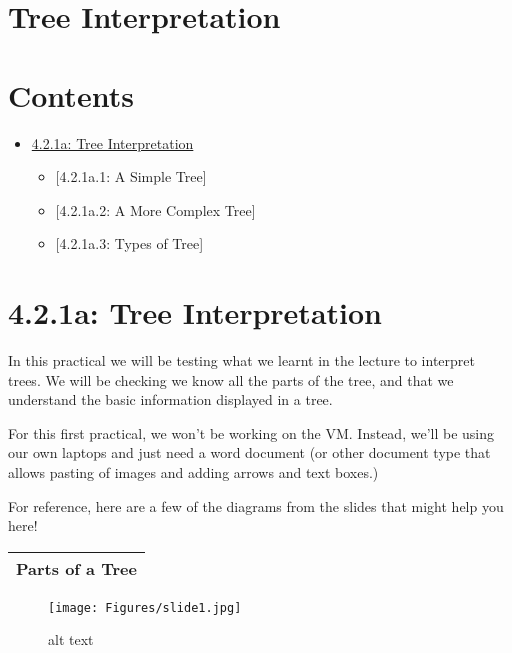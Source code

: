 \documentclass[
]{article}
\author{}
\date{\vspace{-2.5em}}
\providecommand{\tightlist}{%
  \setlength{\itemsep}{0pt}\setlength{\parskip}{0pt}}
\begin{document}
\hypertarget{tree-interpretation}{%
\section{Tree Interpretation}\label{tree-interpretation}}

\hypertarget{contents}{%
\section{Contents}\label{contents}}

\begin{itemize}
\tightlist
\item
  \protect\hyperlink{a-tree-interpretation}{4.2.1a: Tree Interpretation}

  \begin{itemize}
  \tightlist
  \item
    {[}4.2.1a.1: A Simple Tree{]}
  \item
    {[}4.2.1a.2: A More Complex Tree{]}
  \item
    {[}4.2.1a.3: Types of Tree{]}
  \end{itemize}
\end{itemize}

\hypertarget{a-tree-interpretation}{%
\section{4.2.1a: Tree Interpretation}\label{a-tree-interpretation}}

In this practical we will be testing what we learnt in the lecture to
interpret trees. We will be checking we know all the parts of the tree,
and that we understand the basic information displayed in a tree.

For this first practical, we won't be working on the VM. Instead, we'll
be using our own laptops and just need a word document (or other
document type that allows pasting of images and adding arrows and text
boxes.)

For reference, here are a few of the diagrams from the slides that might
help you here!

\begin{longtable}[]{@{}c@{}}
\toprule()
\textbf{Parts of a Tree} \\
\midrule()
\endhead
\bottomrule()
\end{longtable}

\begin{figure}
\centering
\texttt{[image: Figures/slide1.jpg]}
\caption{alt text}
\end{figure}
\end{document}
